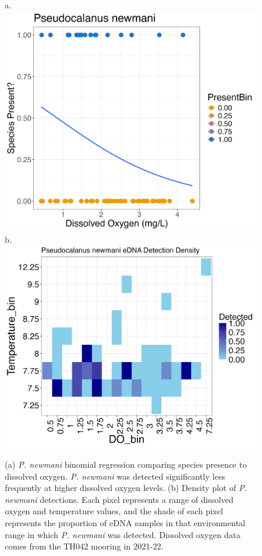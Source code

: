 \documentclass[12pt,twoside]{reedthesis}
\begin{document}
{	\begin{figure}[!h]
		\begin{center}
			a. \includegraphics[scale=0.3]{Pnewmani_binom_sig_neg}
			b. \includegraphics[scale=0.3]{Pnewmani_Density} \\
			\caption[\textit{P. newmani} binomial regression and density plot]{\footnotesize{(a) \textit{P. newmani} binomial regression comparing species presence to dissolved oxygen. \textit{P. newmani} was detected significantly less frequently at higher dissolved oxygen levels. (b) Density plot of \textit{P. newmani} detections. Each pixel represents a range of dissolved oxygen and temperature values, and the shade of each pixel represents the proportion of eDNA samples in that environmental range in which \textit{P. newmani} was detected. Dissolved oxygen data comes from the TH042 mooring in 2021-22.}} %
			\label{PnewmaniBinomDensity}
		\end{center}
	\end{figure} 
	
}
\end{document}
